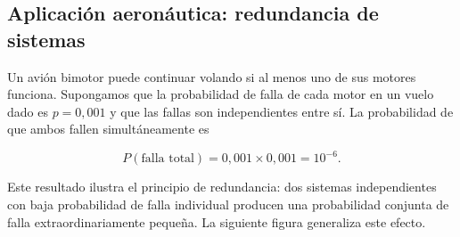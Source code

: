 \documentclass[
  spanish,
  letterpaper,
  DIV=11,
  numbers=noendperiod]{scrartcl}
\begin{document}
\subsection{Aplicación aeronáutica: redundancia de
sistemas}\label{aplicaciuxf3n-aeronuxe1utica-redundancia-de-sistemas}

Un avión bimotor puede continuar volando si al menos uno de sus motores
funciona. Supongamos que la probabilidad de falla de cada motor en un
vuelo dado es \(p = 0{,}001\) y que las fallas son independientes entre
sí. La probabilidad de que ambos fallen simultáneamente es

\[P(\text{falla total}) = 0{,}001 \times 0{,}001 = 10^{-6}.\]

Este resultado ilustra el principio de redundancia: dos sistemas
independientes con baja probabilidad de falla individual producen una
probabilidad conjunta de falla extraordinariamente pequeña. La siguiente
figura generaliza este efecto.
\end{document}
